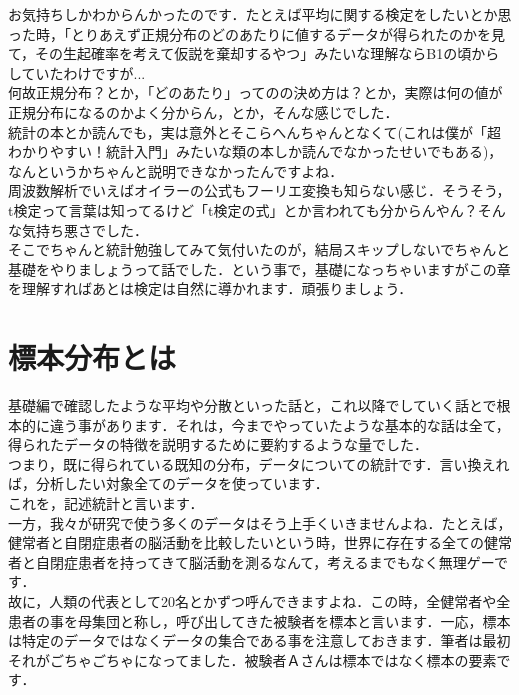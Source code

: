 \documentclass[11pt,a4paper]{ujreport} 	%
\begin{document}
お気持ちしかわからんかったのです．たとえば平均に関する検定をしたいとか思った時，「とりあえず正規分布のどのあたりに値するデータが得られたのかを見て，その生起確率を考えて仮説を棄却するやつ」みたいな理解ならB1の頃からしていたわけですが...\\

何故正規分布？とか，「どのあたり」ってのの決め方は？とか，実際は何の値が正規分布になるのかよく分からん，とか，そんな感じでした．\\

統計の本とか読んでも，実は意外とそこらへんちゃんとなくて(これは僕が「超わかりやすい！統計入門」みたいな類の本しか読んでなかったせいでもある)，なんというかちゃんと説明できなかったんですよね．\\

周波数解析でいえばオイラーの公式もフーリエ変換も知らない感じ．そうそう，t検定って言葉は知ってるけど「t検定の式」とか言われても分からんやん？そんな気持ち悪さでした．\\

そこでちゃんと統計勉強してみて気付いたのが，結局スキップしないでちゃんと基礎をやりましょうって話でした．という事で，基礎になっちゃいますがこの章を理解すればあとは検定は自然に導かれます．頑張りましょう．

\section{標本分布とは}

基礎編で確認したような平均や分散といった話と，これ以降でしていく話とで根本的に違う事があります．それは，今までやっていたような基本的な話は全て，得られたデータの特徴を説明するために要約するような量でした．\\

つまり，既に得られている既知の分布，データについての統計です．言い換えれば，分析したい対象全てのデータを使っています．\\

これを，記述統計と言います．\\

一方，我々が研究で使う多くのデータはそう上手くいきませんよね．たとえば，健常者と自閉症患者の脳活動を比較したいという時，世界に存在する全ての健常者と自閉症患者を持ってきて脳活動を測るなんて，考えるまでもなく無理ゲーです．\\

故に，人類の代表として20名とかずつ呼んできますよね．この時，全健常者や全患者の事を母集団と称し，呼び出してきた被験者を標本と言います．一応，標本は特定のデータではなくデータの集合である事を注意しておきます．筆者は最初それがごちゃごちゃになってました．被験者Ａさんは標本ではなく標本の要素です．\\
\end{document}
